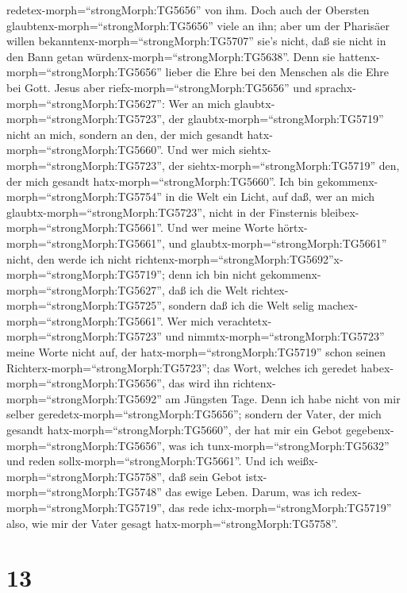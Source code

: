 redetex-morph=``strongMorph:TG5656'' von ihm.  Doch auch
der Obersten glaubtenx-morph=``strongMorph:TG5656'' viele an ihn; aber
um der Pharisäer willen bekanntenx-morph=``strongMorph:TG5707'' sie's
nicht, daß sie nicht in den Bann getan
würdenx-morph=``strongMorph:TG5638''.  Denn sie
hattenx-morph=``strongMorph:TG5656'' lieber die Ehre bei den Menschen
als die Ehre bei Gott.  Jesus aber
riefx-morph=``strongMorph:TG5656'' und
sprachx-morph=``strongMorph:TG5627'': Wer an mich
glaubtx-morph=``strongMorph:TG5723'', der
glaubtx-morph=``strongMorph:TG5719'' nicht an mich, sondern an den, der
mich gesandt hatx-morph=``strongMorph:TG5660''.  Und wer
mich siehtx-morph=``strongMorph:TG5723'', der
siehtx-morph=``strongMorph:TG5719'' den, der mich gesandt
hatx-morph=``strongMorph:TG5660''.  Ich bin
gekommenx-morph=``strongMorph:TG5754'' in die Welt ein Licht, auf daß,
wer an mich glaubtx-morph=``strongMorph:TG5723'', nicht in der
Finsternis bleibex-morph=``strongMorph:TG5661''.  Und wer
meine Worte hörtx-morph=``strongMorph:TG5661'', und
glaubtx-morph=``strongMorph:TG5661'' nicht, den werde ich nicht
richtenx-morph=``strongMorph:TG5692''\textbar x-morph=``strongMorph:TG5719'';
denn ich bin nicht gekommenx-morph=``strongMorph:TG5627'', daß ich die
Welt richtex-morph=``strongMorph:TG5725'', sondern daß ich die Welt
selig machex-morph=``strongMorph:TG5661''.  Wer mich
verachtetx-morph=``strongMorph:TG5723'' und
nimmtx-morph=``strongMorph:TG5723'' meine Worte nicht auf, der
hatx-morph=``strongMorph:TG5719'' schon seinen
Richterx-morph=``strongMorph:TG5723''; das Wort, welches ich geredet
habex-morph=``strongMorph:TG5656'', das wird ihn
richtenx-morph=``strongMorph:TG5692'' am Jüngsten Tage. 
Denn ich habe nicht von mir selber
geredetx-morph=``strongMorph:TG5656''; sondern der Vater, der mich
gesandt hatx-morph=``strongMorph:TG5660'', der hat mir ein Gebot
gegebenx-morph=``strongMorph:TG5656'', was ich
tunx-morph=``strongMorph:TG5632'' und reden
sollx-morph=``strongMorph:TG5661''.  Und ich
weißx-morph=``strongMorph:TG5758'', daß sein Gebot
istx-morph=``strongMorph:TG5748'' das ewige Leben. Darum, was ich
redex-morph=``strongMorph:TG5719'', das rede
ichx-morph=``strongMorph:TG5719'' also, wie mir der Vater gesagt
hatx-morph=``strongMorph:TG5758''.

\hypertarget{section-12}{%
\section{13}\label{section-12}}

